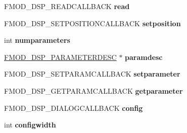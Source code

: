 \begin{DoxyCompactItemize}
\item 
F\+M\+O\+D\+\_\+\+D\+S\+P\+\_\+\+R\+E\+A\+D\+C\+A\+L\+L\+B\+A\+CK {\bfseries read}\hypertarget{struct_f_m_o_d___d_s_p___d_e_s_c_r_i_p_t_i_o_n_a1c33b7154583cb5b1f650df7384f323f}{}\label{struct_f_m_o_d___d_s_p___d_e_s_c_r_i_p_t_i_o_n_a1c33b7154583cb5b1f650df7384f323f}

\item 
F\+M\+O\+D\+\_\+\+D\+S\+P\+\_\+\+S\+E\+T\+P\+O\+S\+I\+T\+I\+O\+N\+C\+A\+L\+L\+B\+A\+CK {\bfseries setposition}\hypertarget{struct_f_m_o_d___d_s_p___d_e_s_c_r_i_p_t_i_o_n_a27a9b7951bdc37fe319b26c98222d9db}{}\label{struct_f_m_o_d___d_s_p___d_e_s_c_r_i_p_t_i_o_n_a27a9b7951bdc37fe319b26c98222d9db}

\item 
int {\bfseries numparameters}\hypertarget{struct_f_m_o_d___d_s_p___d_e_s_c_r_i_p_t_i_o_n_a6258ca66c8ed1583159b0a6d3bf05d68}{}\label{struct_f_m_o_d___d_s_p___d_e_s_c_r_i_p_t_i_o_n_a6258ca66c8ed1583159b0a6d3bf05d68}

\item 
\hyperlink{struct_f_m_o_d___d_s_p___p_a_r_a_m_e_t_e_r_d_e_s_c}{F\+M\+O\+D\+\_\+\+D\+S\+P\+\_\+\+P\+A\+R\+A\+M\+E\+T\+E\+R\+D\+E\+SC} $\ast$ {\bfseries paramdesc}\hypertarget{struct_f_m_o_d___d_s_p___d_e_s_c_r_i_p_t_i_o_n_a06e200c4e4316a4fd05649a4d14db422}{}\label{struct_f_m_o_d___d_s_p___d_e_s_c_r_i_p_t_i_o_n_a06e200c4e4316a4fd05649a4d14db422}

\item 
F\+M\+O\+D\+\_\+\+D\+S\+P\+\_\+\+S\+E\+T\+P\+A\+R\+A\+M\+C\+A\+L\+L\+B\+A\+CK {\bfseries setparameter}\hypertarget{struct_f_m_o_d___d_s_p___d_e_s_c_r_i_p_t_i_o_n_af8f88dcd36c8bedd7e675c99e43824a7}{}\label{struct_f_m_o_d___d_s_p___d_e_s_c_r_i_p_t_i_o_n_af8f88dcd36c8bedd7e675c99e43824a7}

\item 
F\+M\+O\+D\+\_\+\+D\+S\+P\+\_\+\+G\+E\+T\+P\+A\+R\+A\+M\+C\+A\+L\+L\+B\+A\+CK {\bfseries getparameter}\hypertarget{struct_f_m_o_d___d_s_p___d_e_s_c_r_i_p_t_i_o_n_a1cc169e951257f2d5fe5f7f31dd92011}{}\label{struct_f_m_o_d___d_s_p___d_e_s_c_r_i_p_t_i_o_n_a1cc169e951257f2d5fe5f7f31dd92011}

\item 
F\+M\+O\+D\+\_\+\+D\+S\+P\+\_\+\+D\+I\+A\+L\+O\+G\+C\+A\+L\+L\+B\+A\+CK {\bfseries config}\hypertarget{struct_f_m_o_d___d_s_p___d_e_s_c_r_i_p_t_i_o_n_a9264d74f606ed0cf5f23a4633c30b3b6}{}\label{struct_f_m_o_d___d_s_p___d_e_s_c_r_i_p_t_i_o_n_a9264d74f606ed0cf5f23a4633c30b3b6}

\item 
int {\bfseries configwidth}\hypertarget{struct_f_m_o_d___d_s_p___d_e_s_c_r_i_p_t_i_o_n_a245ac31fdb312449734f15ff8c03c0f0}{}\label{struct_f_m_o_d___d_s_p___d_e_s_c_r_i_p_t_i_o_n_a245ac31fdb312449734f15ff8c03c0f0}


\end{DoxyCompactItemize}
